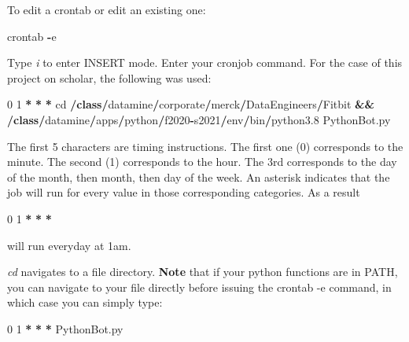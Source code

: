 \documentclass[]{book}
\newenvironment{Shaded}{\begin{snugshade}}{\end{snugshade}}
\newcommand{\BuiltInTok}[1]{#1}
\newcommand{\DecValTok}[1]{\textcolor[rgb]{0.00,0.00,0.81}{#1}}
\newcommand{\FloatTok}[1]{\textcolor[rgb]{0.00,0.00,0.81}{#1}}
\newcommand{\KeywordTok}[1]{\textcolor[rgb]{0.13,0.29,0.53}{\textbf{#1}}}
\newcommand{\NormalTok}[1]{#1}
\newcommand{\OperatorTok}[1]{\textcolor[rgb]{0.81,0.36,0.00}{\textbf{#1}}}
\begin{document}
To edit a crontab or edit an existing one:

\begin{Shaded}
\begin{Highlighting}[]
\NormalTok{crontab }\OperatorTok{-}\NormalTok{e}
\end{Highlighting}
\end{Shaded}

Type \emph{i} to enter INSERT mode. Enter your cronjob command. For the case of this project on scholar, the following was used:

\begin{Shaded}
\begin{Highlighting}[]
\DecValTok{0} \DecValTok{1} \OperatorTok{*} \OperatorTok{*} \OperatorTok{*}\NormalTok{ cd }\OperatorTok{/}\KeywordTok{class}\OperatorTok{/}\NormalTok{datamine}\OperatorTok{/}\NormalTok{corporate}\OperatorTok{/}\NormalTok{merck}\OperatorTok{/}\NormalTok{DataEngineers}\OperatorTok{/}\NormalTok{Fitbit }\OperatorTok{&&} \OperatorTok{/}\KeywordTok{class}\OperatorTok{/}\NormalTok{datamine}\OperatorTok{/}\NormalTok{apps}\OperatorTok{/}\NormalTok{python}\OperatorTok{/}\NormalTok{f2020}\OperatorTok{-}\NormalTok{s2021}\OperatorTok{/}\NormalTok{env}\OperatorTok{/}\BuiltInTok{bin}\OperatorTok{/}\NormalTok{python3}\FloatTok{.8}\NormalTok{ PythonBot.py}
\end{Highlighting}
\end{Shaded}

The first 5 characters are timing instructions. The first one (0) corresponds to the minute. The second (1) corresponds to the hour. The 3rd corresponds to the day of the month, then month, then day of the week. An asterisk indicates that the job will run for every value in those corresponding categories. As a result

\begin{Shaded}
\begin{Highlighting}[]
\DecValTok{0} \DecValTok{1} \OperatorTok{*} \OperatorTok{*} \OperatorTok{*} 
\end{Highlighting}
\end{Shaded}

will run everyday at 1am.

\emph{cd} navigates to a file directory. \textbf{Note} that if your python functions are in PATH, you can navigate to your file directly before issuing the crontab -e command, in which case you can simply type:

\begin{Shaded}
\begin{Highlighting}[]
\DecValTok{0} \DecValTok{1} \OperatorTok{*} \OperatorTok{*} \OperatorTok{*}\NormalTok{ PythonBot.py}
\end{Highlighting}
\end{Shaded}
\end{document}
